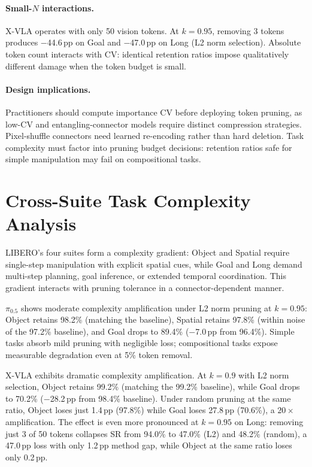 \paragraph{Small-$N$ interactions.}
X-VLA operates with only 50 vision tokens. At $k{=}0.95$, removing 3 tokens produces $-$44.6\,pp on Goal and $-$47.0\,pp on Long (L2 norm selection). Absolute token count interacts with CV: identical retention ratios impose qualitatively different damage when the token budget is small.

\paragraph{Design implications.}
Practitioners should compute importance CV before deploying token pruning, as low-CV and entangling-connector models require distinct compression strategies. Pixel-shuffle connectors need learned re-encoding rather than hard deletion. Task complexity must factor into pruning budget decisions: retention ratios safe for simple manipulation may fail on compositional tasks.


\section{Cross-Suite Task Complexity Analysis}
\label{app:cross_suite_extended}

LIBERO's four suites form a complexity gradient: Object and Spatial require single-step manipulation with explicit spatial cues, while Goal and Long demand multi-step planning, goal inference, or extended temporal coordination. This gradient interacts with pruning tolerance in a connector-dependent manner.

$\pi_{0.5}$ shows moderate complexity amplification under L2 norm pruning at $k{=}0.95$: Object retains 98.2\% (matching the baseline), Spatial retains 97.8\% (within noise of the 97.2\% baseline), and Goal drops to 89.4\% ($-$7.0\,pp from 96.4\%). Simple tasks absorb mild pruning with negligible loss; compositional tasks expose measurable degradation even at 5\% token removal.

X-VLA exhibits dramatic complexity amplification. At $k{=}0.9$ with L2 norm selection, Object retains 99.2\% (matching the 99.2\% baseline), while Goal drops to 70.2\% ($-$28.2\,pp from 98.4\% baseline). Under random pruning at the same ratio, Object loses just 1.4\,pp (97.8\%) while Goal loses 27.8\,pp (70.6\%), a $20{\times}$ amplification. The effect is even more pronounced at $k{=}0.95$ on Long: removing just 3 of 50 tokens collapses SR from 94.0\% to 47.0\% (L2) and 48.2\% (random), a 47.0\,pp loss with only 1.2\,pp method gap, while Object at the same ratio loses only 0.2\,pp.

